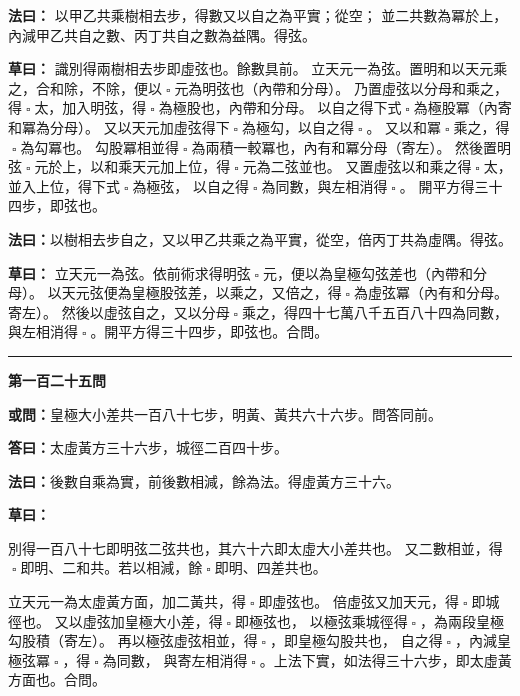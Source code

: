 \documentclass[11pt,a4paper]{article}
\let\origsquare\square
\renewcommand{\square}{\ensuremath{\origsquare}}%
\newcommand{\longline}{\noindent\rule{\textwidth}{0.4pt}}
\newcommand{\owen}[1]{%
  \par\vspace{0.4em}%
  \noindent\textcolor{problemcolor}{\textbf{或問：}}{\tradfont #1}\par\nopagebreak%
}
\newcommand{\fayue}[1]{%
  \par\noindent\textcolor{methodcolor}{\textbf{法曰：}}{\tradfont #1}\par\nopagebreak%
}
\newcommand{\tsaoyue}[1]{%
  \par\noindent\textcolor{workcolor}{\textbf{草曰：}}{\tradfont #1}\par%
}
\newcommand{\dayue}[1]{%
  \par\noindent\textcolor{anscolor}{\textbf{答曰：}}{\tradfont #1}\par\nopagebreak%
}
\newcommand{\wen}[1]{\par\vspace{0.3em}\noindent\textcolor{problemcolor}{\textbf{第#1問}}\par}
\begin{document}
\fayue{%
以甲乙共乘樹相去步，得數又以自之為平實；從空；
並二共數為冪於上，內減甲乙共自之數、丙丁共自之數為益隅。得弦。}

\tsaoyue{%
識別得兩樹相去步即虛弦也。餘數具前。
立天元一為弦。置明和以天元乘之，合和除，不除，便以$ \; \square \; $元為明弦也（內帶和分母）。
乃置虛弦以分母和乘之，得$ \; \square \; $太，加入明弦，得$ \; \square \; $為極股也，內帶和分母。
以自之得下式$ \; \square \; $為極股冪（內寄和冪為分母）。
又以天元加虛弦得下$ \; \square \; $為極勾，以自之得$ \; \square \; $。
又以和冪$ \; \square \; $乘之，得$ \; \square \; $為勾冪也。
勾股冪相並得$ \; \square \; $為兩積一較冪也，內有和冪分母（寄左）。
然後置明弦$ \; \square \; $元於上，以和乘天元加上位，得$ \; \square \; $元為二弦並也。
又置虛弦以和乘之得$ \; \square \; $太，並入上位，得下式$ \; \square \; $為極弦，
以自之得$ \; \square \; $為同數，與左相消得$ \; \square \; $。
開平方得三十四步，即弦也。}

\fayue{以樹相去步自之，又以甲乙共乘之為平實，從空，倍丙丁共為虛隅。得弦。}

\tsaoyue{%
立天元一為弦。依前術求得明弦$ \; \square \; $元，便以為皇極勾弦差也（內帶和分母）。
以天元弦便為皇極股弦差，以乘之，又倍之，得$ \; \square \; $為虛弦冪（內有和分母。寄左）。
然後以虛弦自之，又以分母$ \; \square \; $乘之，得四十七萬八千五百八十四為同數，
與左相消得$ \; \square \; $。開平方得三十四步，即弦也。合問。}

\vspace{0.5cm}
\begin{center}
\longline
\end{center}

\wen{一百二十五}
\owen{皇極大小差共一百八十七步，明黃、黃共六十六步。問答同前。}
\dayue{太虛黃方三十六步，城徑二百四十步。}

\fayue{後數自乘為實，前後數相減，餘為法。得虛黃方三十六。}

\tsaoyue{%
別得一百八十七即明弦二弦共也，其六十六即太虛大小差共也。
又二數相並，得$ \; \square \; $即明、二和共。若以相減，餘$ \; \square \; $即明、四差共也。

立天元一為太虛黃方面，加二黃共，得$ \; \square \; $即虛弦也。
倍虛弦又加天元，得$ \; \square \; $即城徑也。
又以虛弦加皇極大小差，得$ \; \square \; $即極弦也，
以極弦乘城徑得$ \; \square \; $，為兩段皇極勾股積（寄左）。
再以極弦虛弦相並，得$ \; \square \; $，即皇極勾股共也，
自之得$ \; \square \; $，內減皇極弦冪$ \; \square \; $，得$ \; \square \; $為同數，
與寄左相消得$ \; \square \; $。上法下實，如法得三十六步，即太虛黃方面也。合問。}
\end{document}
